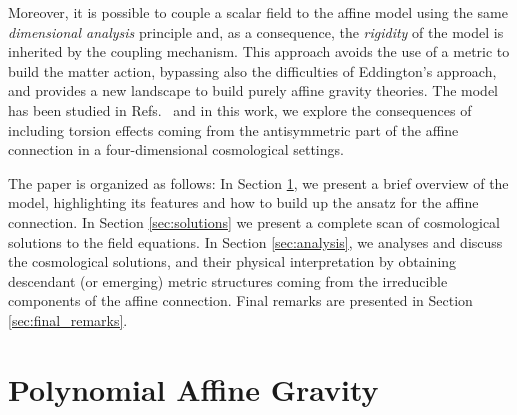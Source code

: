 \documentclass[epj]{svjour}
\begin{document}
Moreover, it is possible to couple a scalar field to the affine model using the same \textit{dimensional analysis} principle and, as a consequence, the \textit{rigidity} of the model is inherited by the coupling mechanism. This approach avoids the use of a metric to build the matter action, bypassing also the difficulties of Eddington's approach, and provides a new landscape to build purely affine gravity theories. The model has been studied in Refs.~\cite{castillofelisola2016polynomial,castillofelisola2016einsteins,castillofelisola2019cosmological,Castillo_Felisola_2018,Castillo_Felisola_2020,Castillo_Felisola_2022_EPJC,Castillo_Felisola_2022_Universe} and in this work, we explore the consequences of including torsion effects coming from the antisymmetric part of the affine connection in a four-dimensional cosmological settings.

The paper is organized as follows: In Section \ref{sec:PAG}, we present a brief overview of the model, highlighting its features and how to build up the ansatz for the affine connection. In Section \ref{sec:solutions} we present a complete scan of cosmological solutions to the field equations. In Section \ref{sec:analysis}, we analyses and discuss the cosmological solutions, and their physical interpretation by obtaining descendant (or emerging) metric structures coming from the irreducible components of the affine connection. Final remarks are presented in Section \ref{sec:final_remarks}. 

\section{Polynomial Affine Gravity}
\label{sec:PAG}
\end{document}
